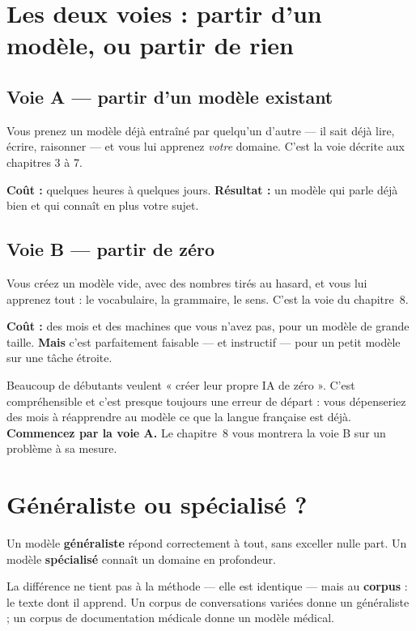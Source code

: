 \section{Les deux voies : partir d'un modèle, ou partir de rien}

\subsection*{Voie A — partir d'un modèle existant}

Vous prenez un modèle déjà entraîné par quelqu'un d'autre — il sait déjà lire,
écrire, raisonner — et vous lui apprenez \emph{votre} domaine. C'est la voie
décrite aux chapitres 3 à 7.

\textbf{Coût :} quelques heures à quelques jours. \textbf{Résultat :} un modèle
qui parle déjà bien et qui connaît en plus votre sujet.

\subsection*{Voie B — partir de zéro}

Vous créez un modèle vide, avec des nombres tirés au hasard, et vous lui
apprenez tout : le vocabulaire, la grammaire, le sens. C'est la voie du
chapitre~8.

\textbf{Coût :} des mois et des machines que vous n'avez pas, pour un modèle de
grande taille. \textbf{Mais} c'est parfaitement faisable — et instructif — pour
un petit modèle sur une tâche étroite.

\begin{nkpiege}
Beaucoup de débutants veulent « créer leur propre IA de zéro ». C'est
compréhensible et c'est presque toujours une erreur de départ : vous
dépenseriez des mois à réapprendre au modèle ce que la langue française est
déjà. \textbf{Commencez par la voie A.} Le chapitre~8 vous montrera la voie B
sur un problème à sa mesure.
\end{nkpiege}

\section{Généraliste ou spécialisé ?}

Un modèle \textbf{généraliste} répond correctement à tout, sans exceller nulle
part. Un modèle \textbf{spécialisé} connaît un domaine en profondeur.

La différence ne tient pas à la méthode — elle est identique — mais au
\textbf{corpus} : le texte dont il apprend. Un corpus de conversations variées
donne un généraliste ; un corpus de documentation médicale donne un modèle
médical.

